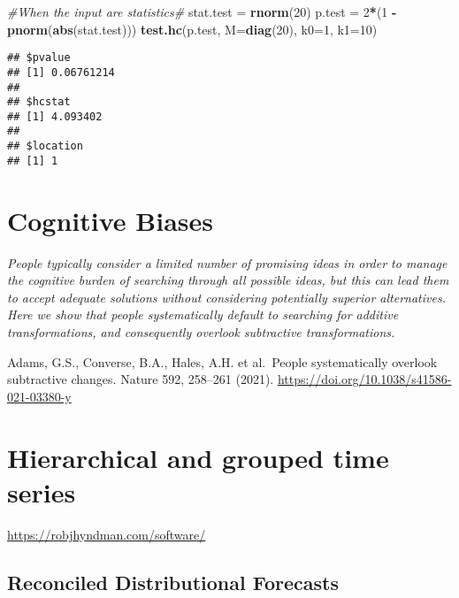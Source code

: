 \documentclass[
  11pt,
]{book}
\newenvironment{Shaded}{\begin{snugshade}}{\end{snugshade}}
\newcommand{\CommentTok}[1]{\textcolor[rgb]{0.56,0.35,0.01}{\textit{#1}}}
\newcommand{\DataTypeTok}[1]{\textcolor[rgb]{0.13,0.29,0.53}{#1}}
\newcommand{\DecValTok}[1]{\textcolor[rgb]{0.00,0.00,0.81}{#1}}
\newcommand{\KeywordTok}[1]{\textcolor[rgb]{0.13,0.29,0.53}{\textbf{#1}}}
\newcommand{\NormalTok}[1]{#1}
\newcommand{\OperatorTok}[1]{\textcolor[rgb]{0.81,0.36,0.00}{\textbf{#1}}}
\newcommand{\StringTok}[1]{\textcolor[rgb]{0.31,0.60,0.02}{#1}}
\begin{document}
\begin{Shaded}
\begin{Highlighting}[]
\CommentTok{#When the input are statistics#}
\NormalTok{stat.test =}\StringTok{ }\KeywordTok{rnorm}\NormalTok{(}\DecValTok{20}\NormalTok{)}
\NormalTok{p.test =}\StringTok{ }\DecValTok{2}\OperatorTok{*}\NormalTok{(}\DecValTok{1} \OperatorTok{-}\StringTok{ }\KeywordTok{pnorm}\NormalTok{(}\KeywordTok{abs}\NormalTok{(stat.test)))}
\KeywordTok{test.hc}\NormalTok{(p.test, }\DataTypeTok{M=}\KeywordTok{diag}\NormalTok{(}\DecValTok{20}\NormalTok{), }\DataTypeTok{k0=}\DecValTok{1}\NormalTok{, }\DataTypeTok{k1=}\DecValTok{10}\NormalTok{)}
\end{Highlighting}
\end{Shaded}

\begin{verbatim}
## $pvalue
## [1] 0.06761214
## 
## $hcstat
## [1] 4.093402
## 
## $location
## [1] 1
\end{verbatim}

\hypertarget{cognitive-biases}{%
\chapter{Cognitive Biases}\label{cognitive-biases}}

\emph{People typically consider a limited number of promising ideas in order to manage the cognitive burden of searching through all possible ideas, but this can lead them to accept adequate solutions without considering potentially superior alternatives. Here we show that people systematically default to searching for additive transformations, and consequently overlook subtractive transformations.}

Adams, G.S., Converse, B.A., Hales, A.H. et al.~People systematically overlook subtractive changes. Nature 592, 258--261 (2021). \url{https://doi.org/10.1038/s41586-021-03380-y}

\hypertarget{hierarchical-and-grouped-time-series}{%
\chapter{Hierarchical and grouped time series}\label{hierarchical-and-grouped-time-series}}

\url{https://robjhyndman.com/software/}

\hypertarget{reconciled-distributional-forecasts}{%
\section{Reconciled Distributional Forecasts}\label{reconciled-distributional-forecasts}}
\end{document}
